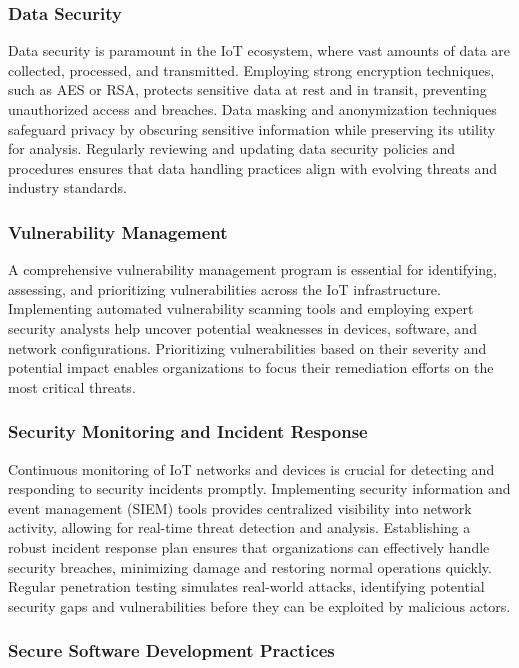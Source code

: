 \documentclass[conference]{IEEEtran}
\begin{document}
\subsubsection{Data Security}

Data security is paramount in the IoT ecosystem, where vast amounts of data are collected, processed, and transmitted. Employing strong encryption techniques, such as AES or RSA, protects sensitive data at rest and in transit, preventing unauthorized access and breaches. Data masking and anonymization techniques safeguard privacy by obscuring sensitive information while preserving its utility for analysis. Regularly reviewing and updating data security policies and procedures ensures that data handling practices align with evolving threats and industry standards.

\subsubsection{Vulnerability Management}

A comprehensive vulnerability management program is essential for identifying, assessing, and prioritizing vulnerabilities across the IoT infrastructure. Implementing automated vulnerability scanning tools and employing expert security analysts help uncover potential weaknesses in devices, software, and network configurations. Prioritizing vulnerabilities based on their severity and potential impact enables organizations to focus their remediation efforts on the most critical threats.

\subsubsection{Security Monitoring and Incident Response}

Continuous monitoring of IoT networks and devices is crucial for detecting and responding to security incidents promptly. Implementing security information and event management (SIEM) tools provides centralized visibility into network activity, allowing for real-time threat detection and analysis. Establishing a robust incident response plan ensures that organizations can effectively handle security breaches, minimizing damage and restoring normal operations quickly. Regular penetration testing simulates real-world attacks, identifying potential security gaps and vulnerabilities before they can be exploited by malicious actors.

\subsubsection{Secure Software Development Practices}
\end{document}
